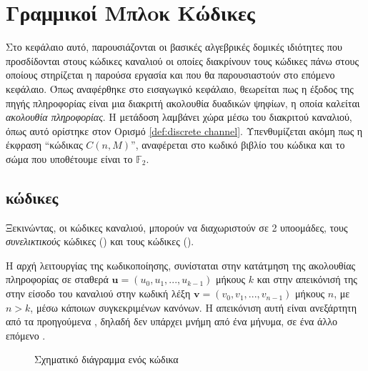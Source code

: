\chapter{Γραμμικοί Μπλoκ Κώδικες}
Στο κεφάλαιο αυτό, παρουσιάζονται οι βασικές αλγεβρικές δομικές ιδιότητες που προσδίδονται στους κώδικες καναλιού οι οποίες διακρίνουν τους κώδικες πάνω στους οποίους στηρίζεται η παρούσα εργασία και που θα παρουσιαστούν στο επόμενο κεφάλαιο. Όπως αναφέρθηκε στο εισαγωγικό κεφάλαιο, θεωρείται πως η έξοδος της πηγής πληροφορίας είναι μια διακριτή ακολουθία δυαδικών ψηφίων, η οποία καλείται \textit{ακολουθία πληροφορίας}. Η μετάδοση λαμβάνει χώρα μέσω του διακριτού καναλιού, όπως αυτό ορίστηκε στον Ορισμό \ref{def:discrete channel}. Υπενθυμίζεται ακόμη πως η έκφραση \enquote{κώδικας $C(n,M)$}, αναφέρεται στο κωδικό βιβλίο του κώδικα και το σώμα που υποθέτουμε είναι το $\mathbb{F}_2$.

\section{ κώδικες}
Ξεκινώντας, οι κώδικες καναλιού, μπορούν να διαχωριστούν σε 2 υποομάδες, τους \textit{συνελικτικούς} κώδικες () και τους κώδικες \textit{} ().

Η αρχή λειτουργίας της  κωδικοποίησης, συνίσταται στην κατάτμηση της ακολουθίας πληροφορίας σε σταθερά  $\mathbf{u} = (u_0, u_1, ..., u_{k-1})$ μήκους $k$ και στην απεικόνισή της στην είσοδο του καναλιού στην κωδική λέξη $\mathbf{v} = (v_0, v_1, ..., v_{n-1})$ μήκους $n$, με $n>k$, μέσω κάποιων συγκεκριμένων κανόνων. H απεικόνιση αυτή είναι ανεξάρτητη από τα προηγούμενα , δηλαδή δεν υπάρχει μνήμη από ένα  μήνυμα, σε ένα άλλο επόμενο \cite{proakis1994communication}.

\begin{figure}[h]
\caption{Σχηματικό διάγραμμα ενός  κώδικα}
\label{fig:linear block codes}
\end{figure}

